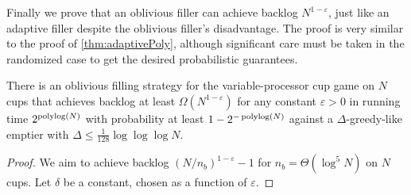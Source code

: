 Finally we prove that an oblivious filler can achieve backlog
$N^{1-\varepsilon}$, just like an adaptive filler despite the
oblivious filler's disadvantage. The proof is very similar to the
proof of \cref{thm:adaptivePoly}, although significant care must
be taken in the randomized case to get the desired probabilistic
guarantees. 
\begin{theorem}
  \label{thm:obliviousPoly}
  There is an oblivious filling strategy for the
  variable-processor cup game on $N$ cups that achieves backlog
  at least $\Omega(N^{1-\varepsilon})$ for any constant $\varepsilon
  >0$ in running time $2^{\operatorname{\textnormal{polylog}}(N)}$ with probability at least
  $1-2^{-\operatorname{\textnormal{polylog}}(N)}$ against a $\Delta$-greedy-like emptier
  with $\Delta \le \frac{1}{128} \log\log\log N$.
\end{theorem}
\begin{proof}
  We aim to achieve backlog $(N/n_b)^{1-\varepsilon}-1$ for 
  $n_b = \Theta(\log^5 N)$ on $N$ cups.
  Let $\delta$ be a constant, chosen as a function of $\varepsilon$.


\end{proof}
